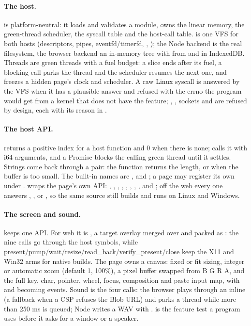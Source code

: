 \paragraph{The host.}  is platform-neutral: it loads and
validates a module, owns the linear memory, the green-thread scheduler, the
syscall table and the host-call table.   is one VFS for both hosts
(descriptors, pipes, eventfd/timerfd, , ); the Node backend
is the real filesystem, the browser backend an in-memory tree with
 from  and  in IndexedDB.  Threads are
green threads with a fuel budget: a slice ends after its fuel, a blocking
call parks the thread and the scheduler resumes the next one, and
 freezes a hidden page's clock and scheduler.  A raw Linux
syscall is answered by the VFS when it has a plausible answer and refused
with the errno the program would get from a kernel that does not have the
feature; , , sockets and  are refused by
design, each with its reason in .

\paragraph{The host API.}  returns a
positive index for a host function and 0 when there is none;
 calls it with  i64 arguments, and a
Promise blocks the calling green thread until it settles.  Strings come back
through a  pair: the function returns the length, or
 when the buffer is too small.  The built-in names are
,  and ; a page may register its own under
.   wraps the page's own API: ,
, , , , , ,
,  and ; off the web every one answers
, ,  or , so the same source still builds and
runs on Linux and Windows.

\paragraph{The screen and sound.}  keeps one API.  For web it is
, a target overlay merged over  and packed as
: the nine  calls go through the host symbols, while
present/pump/wait/resize/read\_back/verify\_present/close keep the X11 and
Win32 arms for native builds.  The page owns a canvas: fixed or fit sizing,
integer or automatic zoom (default 1, 100\%), a pixel buffer swapped from
B G R A, and the full
key, char, pointer, wheel, focus, composition and paste input map, with
 and  becoming events.  Sound is the four
 calls: the browser plays through an inline
 (a  fallback when a CSP refuses the
Blob URL) and parks a thread while more than 250 ms is queued; Node writes a
WAV with .   is the feature test a
program uses before it asks for a window or a speaker.

